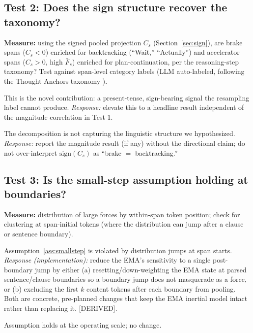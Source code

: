 \documentclass[11pt]{article}
\begin{document}
\subsection{Test 2: Does the sign structure recover the taxonomy?}
\textbf{Measure:} using the signed pooled projection $C_s$ (Section~\ref{sec:sign}), are brake spans ($C_s<0$) enriched for backtracking (``Wait,'' ``Actually'') and accelerator spans ($C_s>0$, high $\bar F_s$) enriched for plan-continuation, per the reasoning-step taxonomy? Test against span-level category labels (LLM auto-labeled, following the Thought Anchors taxonomy \cite{bogdan2025thoughtanchors}).
\begin{description}[leftmargin=1.5em]
  \item[Enrichment present.] This is the novel contribution: a present-tense, sign-bearing signal the resampling label cannot produce. \emph{Response:} elevate this to a headline result independent of the magnitude correlation in Test 1.
  \item[No enrichment.] The decomposition is not capturing the linguistic structure we hypothesized. \emph{Response:} report the magnitude result (if any) without the directional claim; do not over-interpret $\mathrm{sign}(C_s)$ as ``brake $=$ backtracking.''
\end{description}

\subsection{Test 3: Is the small-step assumption holding at boundaries?}
\textbf{Measure:} distribution of large forces by within-span token position; check for clustering at span-initial tokens (where the distribution can jump after a clause or sentence boundary).
\begin{description}[leftmargin=1.5em]
  \item[Clustering at boundaries.] Assumption~\ref{ass:smallstep} is violated by distribution jumps at span starts. \emph{Response (implementation):} reduce the EMA's sensitivity to a single post-boundary jump by either (a) resetting/down-weighting the EMA state at parsed sentence/clause boundaries so a boundary jump does not masquerade as a force, or (b) excluding the first $k$ content tokens after each boundary from pooling. Both are concrete, pre-planned changes that keep the EMA inertial model intact rather than replacing it. \textsf{[DERIVED]}.
  \item[No clustering.] Assumption holds at the operating scale; no change.
\end{description}
\end{document}
